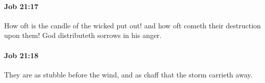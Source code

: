 		\paragraph{Job 21:17} %
			\label{JOB-21-17}

			How oft is the candle of the wicked put out! and how oft cometh their destruction upon them! God distributeth sorrows in his anger.


		\paragraph{Job 21:18} %
			\label{JOB-21-18}

			They are as stubble before the wind, and as chaff that the storm carrieth away.


